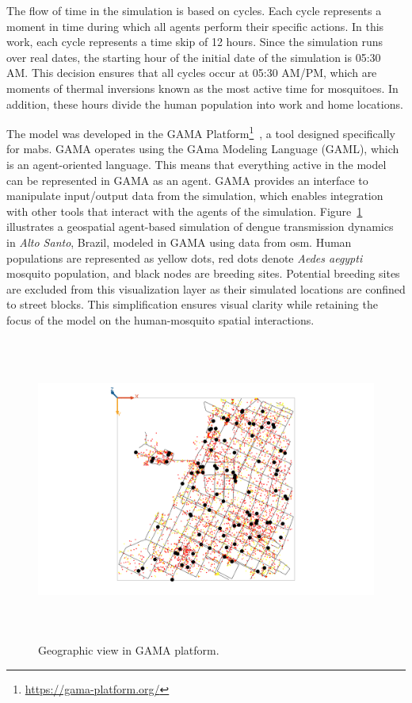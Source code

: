 The flow of time in the simulation is based on cycles. Each cycle represents a moment in time during which all agents perform their specific actions. In this work, each cycle represents a time skip of 12 hours. Since the simulation runs over real dates, the starting hour of the initial date of the simulation is 05:30 AM. This decision ensures that all cycles occur at 05:30 AM/PM, which are moments of thermal inversions known as the most active time for mosquitoes. In addition, these hours divide the human population into work and home locations. 

The model was developed in the GAMA Platform\footnote{\url{https://gama-platform.org/}}~\citep{taillandier:2019}, a tool designed specifically for \gls{mabs}. GAMA operates using the GAma Modeling Language (GAML), which is an agent-oriented language. This means that everything active in the model can be represented in GAMA as an agent. GAMA provides an interface to manipulate input/output data from the simulation, which enables integration with other tools that interact with the agents of the simulation. Figure~\ref{fig:example-gama} illustrates a geospatial agent-based simulation of dengue transmission dynamics in \textit{Alto Santo}, Brazil, modeled in GAMA using data from \gls{osm}. Human populations are represented as yellow dots, red dots denote \textit{Aedes aegypti} mosquito population, and black nodes are breeding sites. Potential breeding sites are excluded from this visualization layer as their simulated locations are confined to street blocks. This simplification ensures visual clarity while retaining the focus of the model on the human-mosquito spatial interactions.

\begin{figure}[!ht]
    \centering
    \includegraphics[width=16cm, height=10cm]{images/gama-example.png}
    \caption{Geographic view in GAMA platform.}
    \label{fig:example-gama}
\end{figure}

